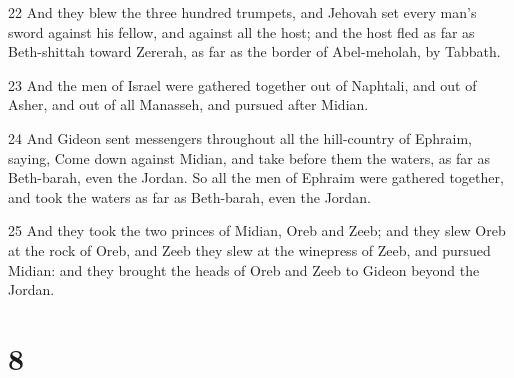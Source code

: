 \par 22 And they blew the three hundred trumpets, and Jehovah set every man's sword against his fellow, and against all the host; and the host fled as far as Beth-shittah toward Zererah, as far as the border of Abel-meholah, by Tabbath.
\par 23 And the men of Israel were gathered together out of Naphtali, and out of Asher, and out of all Manasseh, and pursued after Midian.
\par 24 And Gideon sent messengers throughout all the hill-country of Ephraim, saying, Come down against Midian, and take before them the waters, as far as Beth-barah, even the Jordan. So all the men of Ephraim were gathered together, and took the waters as far as Beth-barah, even the Jordan.
\par 25 And they took the two princes of Midian, Oreb and Zeeb; and they slew Oreb at the rock of Oreb, and Zeeb they slew at the winepress of Zeeb, and pursued Midian: and they brought the heads of Oreb and Zeeb to Gideon beyond the Jordan.

\chapter{8}

